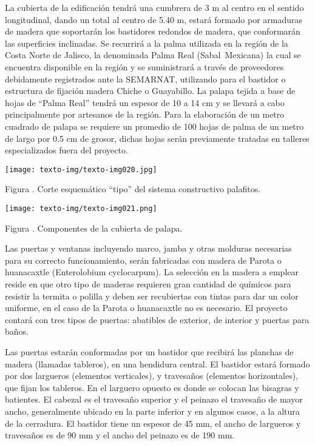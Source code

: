 \documentclass{article}
\newcounter{Figura}
\renewcommand\theFigura{\arabic{Figura}}
\begin{document}
\bigskip

La cubierta de la edificación tendrá una cumbrera de 3 m al centro en el sentido longitudinal, dando un total al centro de 5.40 m, estará formado por armaduras de madera que soportarán los bastidores redondos de madera, que conformarán las superficies inclinadas. Se recurrirá a la palma utilizada en la región de la Costa Norte de Jalisco, la denominada Palma Real (Sabal~Mexicana) la cual se encuentra disponible en la región y se suministrará a través de proveedores debidamente registrados ante la SEMARNAT, utilizando para el bastidor o estructura de fijación madera Chiche o Guayabillo. La palapa tejida a base de hojas de “Palma Real” tendrá un espesor de 10 a 14 cm y se llevará a cabo principalmente por artesanos de la región. Para la elaboración de un metro cuadrado de palapa se requiere un promedio de 100 hojas de palma de un metro de largo por 0.5 cm de grosor, dichas hojas serán previamente tratadas en talleres especializados fuera del proyecto.


\bigskip

 \texttt{[image: texto-img/texto-img020.jpg]} 

Figura \stepcounter{Figura}{\theFigura}. Corte esquemático “tipo” del sistema constructivo palafitos.


\bigskip

 \texttt{[image: texto-img/texto-img021.png]} 

Figura \stepcounter{Figura}{\theFigura}. Componentes de la cubierta de palapa.


\bigskip

Las puertas y ventanas incluyendo marco, jamba y otras molduras necesarias para su correcto funcionamiento, serán fabricadas con madera de Parota o huanacaxtle (Enterolobium cyclocarpum). La selección en la madera a emplear reside en que otro tipo de maderas requieren gran cantidad de químicos para resistir la termita o polilla y deben ser recubiertas con tintas para dar un color uniforme, en el caso de la Parota o huanacaxtle no es necesario. El proyecto contará con tres tipos de puertas: abatibles de exterior, de interior y puertas para baños. 


\bigskip

Las puertas estarán conformadas por un bastidor que recibirá las planchas de madera (llamadas tableros), en una hendidura central. El bastidor estará formado por dos largueros (elementos verticales), y travesaños (elementos horizontales), que fijan los tableros. En el larguero opuesto es donde se colocan las bisagras y batientes. El cabezal es el travesaño superior y el peinazo el travesaño de mayor ancho, generalmente ubicado en la parte inferior y en algunos casos, a la altura de la cerradura. El bastidor tiene un espesor de 45 mm, el ancho de largueros y travesaños es de 90 mm y el ancho del peinazo es de 190 mm.
\end{document}
